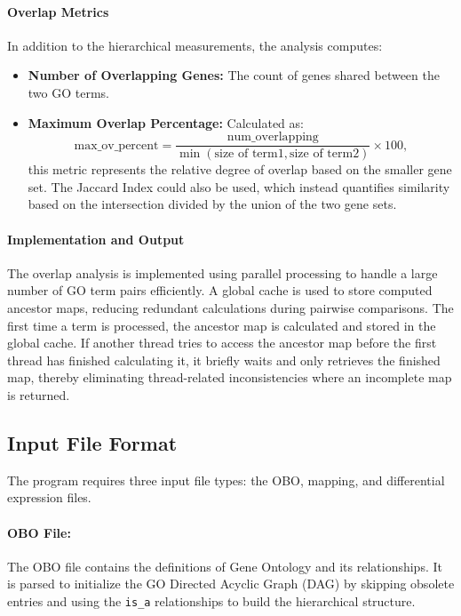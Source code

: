 \documentclass{article}
\begin{document}
    \paragraph{Overlap Metrics}
    In addition to the hierarchical measurements, the analysis computes:
    \begin{itemize}
        \item \textbf{Number of Overlapping Genes:} The count of genes shared between the two GO terms.
        \item \textbf{Maximum Overlap Percentage:} Calculated as:
        \[
            \text{max\_ov\_percent} = \frac{\text{num\_overlapping}}{\min(\text{size of term1}, \text{size of term2})} \times 100,
        \]
        this metric represents the relative degree of overlap based on the smaller gene set. The Jaccard Index could also be used, which instead quantifies similarity based on the intersection divided by the union of the two gene sets.


    \end{itemize}

    \paragraph{Implementation and Output}
    The overlap analysis is implemented using parallel processing to handle a large number of GO term pairs efficiently. A global cache is used to store computed ancestor maps, reducing redundant calculations during pairwise comparisons. The first time a term is processed, the ancestor map is calculated and stored in the global cache. If another thread tries to access the ancestor map before the first thread has finished calculating it, it briefly waits and only retrieves the finished map, thereby eliminating thread-related inconsistencies where an incomplete map is returned.

    \subsection{Input File Format}\label{subsec:input-file-format}
    The program requires three input file types: the OBO, mapping, and differential expression files.

    \paragraph{OBO File:}
    The OBO file contains the definitions of Gene Ontology and its relationships. It is parsed to initialize the GO Directed Acyclic Graph (DAG) by skipping obsolete entries and using the \texttt{is\_a} relationships to build the hierarchical structure.
\end{document}
